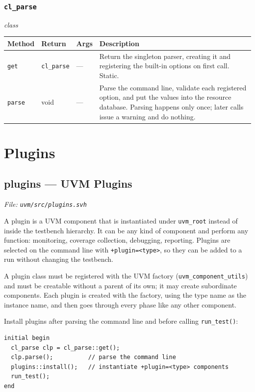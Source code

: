 \documentclass[11pt,letterpaper]{report}
\begin{document}
\subsection*{\texttt{cl\_parse}}
\noindent\small\textit{class}\par

\begin{xltabular}{\linewidth}{>{\small}p{1.35in} >{\small}p{1.25in} >{\small}p{0.95in} >{\small}X}
\toprule
\textbf{Method} & \textbf{Return} & \textbf{Args} & \textbf{Description} \\
\midrule
\endhead
\bottomrule
\endfoot
\texttt{get} & \texttt{cl\_parse} & --- & Return the singleton parser, creating it and registering the built-in options on first call. Static. \\
\texttt{parse} & void & --- & Parse the command line, validate each registered option, and put the values into the resource database. Parsing happens only once; later calls issue a warning and do nothing. \\
\end{xltabular}

\chapter{Plugins}
\section{plugins --- UVM Plugins}
\noindent\small\textit{File: \texttt{uvm/src/plugins.svh}}\par

A plugin is a UVM component that is instantiated under \texttt{uvm\_root} instead of inside the testbench hierarchy. It can be any kind of component and perform any function: monitoring, coverage collection, debugging, reporting. Plugins are selected on the command line with \texttt{+plugin=\textless{}type\textgreater{}}, so they can be added to a run without changing the testbench.

A plugin class must be registered with the UVM factory (\texttt{uvm\_component\_utils}) and must be creatable without a parent of its own; it may create subordinate components. Each plugin is created with the factory, using the type name as the instance name, and then goes through every phase like any other component.

Install plugins after parsing the command line and before calling \texttt{run\_test()}:

\begin{verbatim}
initial begin
  cl_parse clp = cl_parse::get();
  clp.parse();          // parse the command line
  plugins::install();   // instantiate +plugin=<type> components
  run_test();
end
\end{verbatim}
\end{document}
